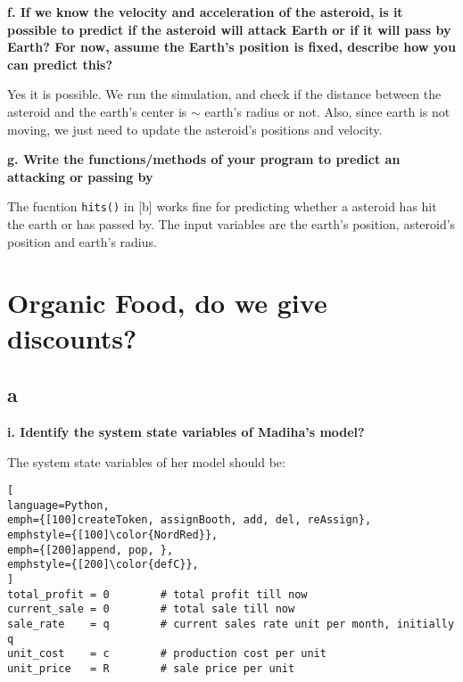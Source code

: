 \documentclass[article, 12pt, a4paper]{memoir}
\begin{document}
\textbf{f. If we know the velocity and acceleration of the asteroid, is it possible to
predict if the asteroid will attack Earth or if it will pass by Earth? For now, assume the
Earth’s position is fixed, describe how you can predict this?}
\vspace{1em}

\begin{solution}
    [f]
    Yes it is possible. We run the simulation, and check if the distance between the
    asteroid and the earth's center is $\sim$ earth's radius or not. Also, since earth is
    not moving, we just need to update the asteroid's positions and velocity.
\end{solution}

\textbf{g. Write the functions/methods of your program to predict an attacking or passing
by}
\vspace{1em}

\begin{solution}
    The fucntion \texttt{hits()} in [b] works fine for predicting whether a asteroid has
    hit the earth or has passed by. The input variables are the earth's position,
    asteroid's position and earth's radius.
\end{solution}


\newpage
\chapter{Organic Food, do we give discounts?}

\section{a}

\textbf{i. Identify the system state variables of Madiha's model?}
\vspace{1em}

\begin{solution}
    [a.i]
    The system state variables of her model should be:

\begin{lstlisting}[
language=Python,
emph={[100]createToken, assignBooth, add, del, reAssign},
emphstyle={[100]\color{NordRed}},
emph={[200]append, pop, },
emphstyle={[200]\color{defC}},
]
total_profit = 0        # total profit till now
current_sale = 0        # total sale till now
sale_rate    = q        # current sales rate unit per month, initially q
unit_cost    = c        # production cost per unit
unit_price   = R        # sale price per unit
\end{lstlisting}
\end{solution}  
\end{document}

